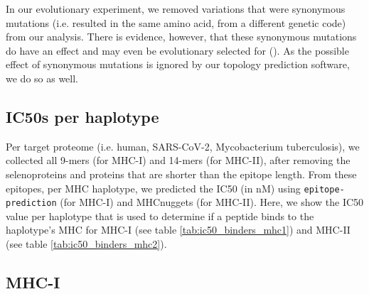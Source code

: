 %
In our evolutionary experiment, 
we removed variations that were synonymous mutations (i.e.
resulted in the same amino acid, from a different genetic code) 
from our analysis.
There is evidence, however, that these synonymous mutations
do have an effect and may even be evolutionary selected 
for (\cite{hunt2009silent}).
As the possible effect of synonymous mutations is ignored by our
topology prediction software, we do so as well.

\subsection{IC50s per haplotype}
\label{subsec:ic50s_per_haplotype}

Per target proteome (i.e. human, SARS-CoV-2, Mycobacterium tuberculosis),
we collected all 9-mers (for MHC-I) and 14-mers (for MHC-II),
after removing the selenoproteins and proteins that are shorter
than the epitope length.
From these epitopes, per MHC haplotype,
we predicted the IC50 (in nM) using \verb;epitope-prediction; (for MHC-I)
and MHCnuggets (for MHC-II). 
Here, we show the IC50 value per haplotype that
is used to determine if a peptide binds to the haplotype's MHC
for MHC-I (see table \ref{tab:ic50_binders_mhc1}) and 
MHC-II (see table \ref{tab:ic50_binders_mhc2}).





\subsection{MHC-I}

